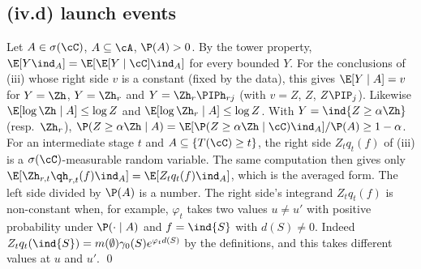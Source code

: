 \documentclass[11pt]{report}
\begin{document}
\subsection{(iv.d) launch events}
Let $A\in\sigma(\cC)$, $A\subseteq\cA$, $\P(A)>0$. By the tower property, $\E[Y\ind_A]=\E[\E[Y\mid\cC]\ind_A]$ for every bounded $Y$. For the conclusions of (iii) whose right side $v$ is a constant (fixed by the data), this gives $\E[Y\mid A]=v$ for $Y=\Zh$, $Y=\Zh_r$ and $Y=\Zh_r\PIPh_{rj}$ (with $v=Z$, $Z$, $Z\PIP_j$). Likewise $\E[\log\Zh\mid A]\le\log Z$ and $\E[\log\Zh_r\mid A]\le\log Z$. With $Y=\ind\{Z\ge\alpha\Zh\}$ (resp.\ $\Zh_r$), $\P(Z\ge\alpha\Zh\mid A)=\E[\P(Z\ge\alpha\Zh\mid\cC)\ind_A]/\P(A)\ge1-\alpha$. For an intermediate stage $t$ and $A\subseteq\{T(\cC)\ge t\}$, the right side $Z_tq_t(f)$ of (iii) is a $\sigma(\cC)$-measurable random variable. The same computation then gives only $\E[\Zh_{r,t}\qh_{r,t}(f)\ind_A]=\E[Z_tq_t(f)\ind_A]$, which is the averaged form. The left side divided by $\P(A)$ is a number. The right side's integrand $Z_tq_t(f)$ is non-constant when, for example, $\varphi_t$ takes two values $u\ne u'$ with positive probability under $\P(\cdot\mid A)$ and $f=\ind\{S\}$ with $d(S)\ne0$. Indeed $Z_tq_t(\ind\{S\})=m(\emptyset)\gamma_0(S)e^{\varphi_td(S)}$ by the definitions, and this takes different values at $u$ and $u'$. \qed
\end{document}
